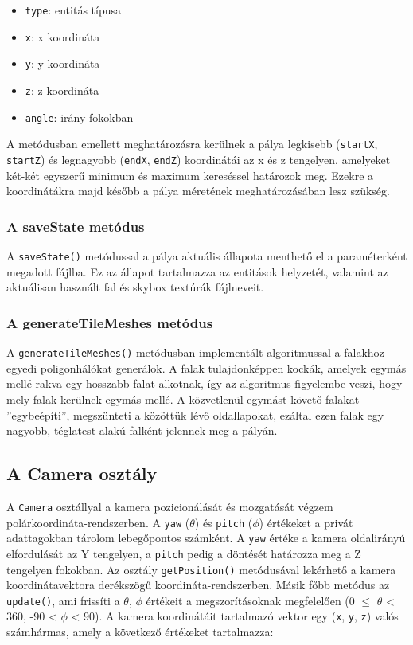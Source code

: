 \begin{itemize}
	\item \verb|type|: entitás típusa
	\item \verb|x|: x koordináta
	\item \verb|y|: y koordináta
	\item \verb|z|: z koordináta
	\item \verb|angle|: irány fokokban
\end{itemize}

A metódusban emellett meghatározásra kerülnek a pálya legkisebb (\verb|startX|, \verb|startZ|) és legnagyobb (\verb|endX|, \verb|endZ|) koordinátái az x és z tengelyen, amelyeket két-két egyszerű minimum és maximum kereséssel határozok meg. Ezekre a koordinátákra majd később a pálya méretének meghatározásában lesz szükség.

\subsubsection{A saveState metódus}

A \verb|saveState()| metódussal a pálya aktuális állapota menthető el a paraméterként megadott fájlba. Ez az állapot tartalmazza az entitások helyzetét, valamint az aktuálisan használt fal és skybox textúrák fájlneveit.

\subsubsection{A generateTileMeshes metódus}

A \verb|generateTileMeshes()| metódusban implementált algoritmussal a falakhoz egyedi poligonhálókat generálok. A falak tulajdonképpen kockák, amelyek egymás mellé rakva egy hosszabb falat alkotnak, így az algoritmus figyelembe veszi, hogy mely falak kerülnek egymás mellé. A közvetlenül egymást követő falakat ''egybeépíti'', megszünteti a közöttük lévő oldallapokat, ezáltal ezen falak egy nagyobb, téglatest alakú falként jelennek meg a pályán.

\subsection{A Camera osztály}

A \verb|Camera| osztállyal a kamera pozicionálását és mozgatását végzem polárkoordináta-rendszerben. A \verb|yaw| ($\theta$) és \verb|pitch| ($\phi$) értékeket a privát adattagokban tárolom lebegőpontos számként. A \verb|yaw| értéke a kamera oldalirányú elfordulását az Y tengelyen, a \verb|pitch| pedig a döntését határozza meg a Z tengelyen fokokban. Az osztály \verb|getPosition()| metódusával lekérhető a kamera koordinátavektora derékszögű koordináta-rendszerben. Másik főbb metódus az \verb|update()|, ami frissíti a $\theta$, $\phi$ értékeit a megszorításoknak megfelelően (0 $\leq$ $\theta$ < 360, -90 < $\phi$ < 90). A kamera koordinátáit tartalmazó vektor egy (\verb|x|, \verb|y|, \verb|z|) valós számhármas, amely a következő értékeket tartalmazza:

